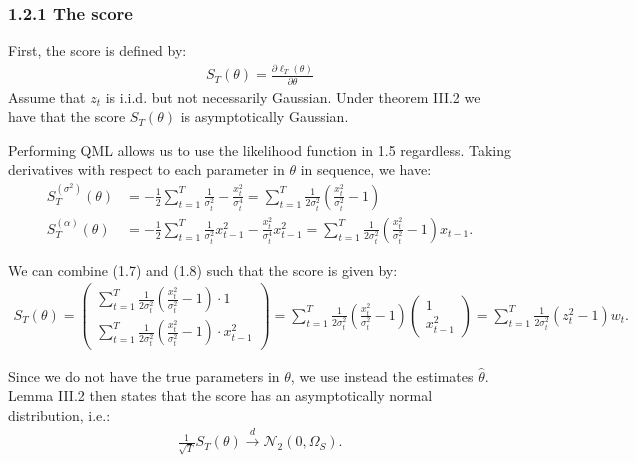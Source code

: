 \documentclass[11pt,a4paper,oneside]{article}
\newcommand{\lp}{\left(}
\newcommand{\rp}{\right)}
\newcommand{\nnn}{\mathcal{N}}
\newcommand{\sumt}{\sum_{t=1}^T}
\begin{document}
\subsubsection{1.2.1 The score}
First, the score is defined by:
\begin{align}
        S_T\lp \theta\rp = \frac{\partial \ell_T\lp \theta\rp}{\partial \theta}
\end{align}
Assume that $z_t$ is i.i.d. but not necessarily Gaussian. Under theorem III.2 we have that the score $S_T\lp \theta\rp$ is asymptotically Gaussian.

Performing QML allows us to use the likelihood function in 1.5 regardless. Taking derivatives with respect to each parameter in $\theta$ in sequence, we have:
\begin{align}
    S_T^{\lp \sigma^2\rp}\lp \theta\rp 
        &= -\frac{1}{2}\sumt \frac{1}{\sigma_t^2} - \frac{x_t^2}{\sigma_t^4} = \sumt\frac{1}{2\sigma_t^2}\lp \frac{x_t^2}{\sigma_t^2} - 1\rp \\
    S_T^{\lp \alpha\rp}\lp \theta\rp 
        &= - \frac{1}{2}\sumt \frac{1}{\sigma_t^2}x_{t-1}^2 - \frac{x_t^2}{\sigma_t^4}x_{t-1}^2
        = \sumt\frac{1}{2\sigma_t^2}\lp \frac{x_t^2}{\sigma_t^2} - 1\rp x_{t-1}.
\end{align}

We can combine (1.7) and (1.8) such that the score is given by:
\begin{align}
    S_T\lp \theta \rp =
        \begin{pmatrix}
            \sumt\frac{1}{2\sigma_t^2}\lp \frac{x_t^2}{\sigma_t^2} - 1\rp \cdot 1\\
            \sumt\frac{1}{2\sigma_t^2}\lp \frac{x_t^2}{\sigma_t^2} - 1\rp \cdot x_{t-1}^2
        \end{pmatrix}
        = \sumt\frac{1}{2\sigma_t^2}\lp \frac{x_t^2}{\sigma_t^2} - 1\rp
            \begin{pmatrix}
                1 \\
                x_{t-1}^2
            \end{pmatrix}
        = \sumt\frac{1}{2\sigma_t^2}\lp z_t^2 - 1\rp w_t.
\end{align}

Since we do not have the true parameters in $\theta$, we use instead the estimates $\hat \theta$. Lemma III.2 then states that the score has an asymptotically normal distribution, i.e.:
\begin{align}
    \frac{1}{\sqrt{T}}S_T\lp \theta\rp \overset{d}{\rightarrow} \nnn_2\lp 0, \Omega_S\rp.
\end{align}
\end{document}

